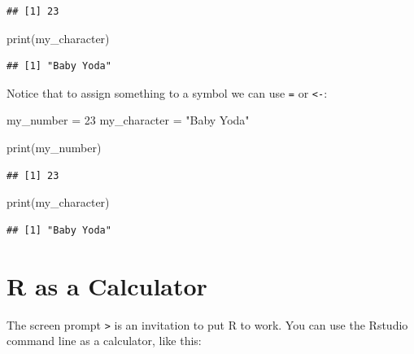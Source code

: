 \documentclass[
]{book}
\newenvironment{Shaded}{\begin{snugshade}}{\end{snugshade}}
\newcommand{\DecValTok}[1]{\textcolor[rgb]{0.00,0.00,0.81}{#1}}
\newcommand{\FunctionTok}[1]{\textcolor[rgb]{0.00,0.00,0.00}{#1}}
\newcommand{\NormalTok}[1]{#1}
\newcommand{\OtherTok}[1]{\textcolor[rgb]{0.56,0.35,0.01}{#1}}
\newcommand{\StringTok}[1]{\textcolor[rgb]{0.31,0.60,0.02}{#1}}
\begin{document}
\begin{verbatim}
## [1] 23
\end{verbatim}

\begin{Shaded}
\begin{Highlighting}[]
\FunctionTok{print}\NormalTok{(my\_character)}
\end{Highlighting}
\end{Shaded}

\begin{verbatim}
## [1] "Baby Yoda"
\end{verbatim}

Notice that to assign something to a symbol we can use \texttt{=} or \texttt{\textless{}-}:

\begin{Shaded}
\begin{Highlighting}[]
\NormalTok{my\_number }\OtherTok{=} \DecValTok{23}
\NormalTok{my\_character }\OtherTok{=} \StringTok{"Baby Yoda"}
\end{Highlighting}
\end{Shaded}

\begin{Shaded}
\begin{Highlighting}[]
\FunctionTok{print}\NormalTok{(my\_number)}
\end{Highlighting}
\end{Shaded}

\begin{verbatim}
## [1] 23
\end{verbatim}

\begin{Shaded}
\begin{Highlighting}[]
\FunctionTok{print}\NormalTok{(my\_character)}
\end{Highlighting}
\end{Shaded}

\begin{verbatim}
## [1] "Baby Yoda"
\end{verbatim}

\hypertarget{r-as-a-calculator}{%
\section{R as a Calculator}\label{r-as-a-calculator}}

The screen prompt \texttt{\textgreater{}} is an invitation to put R to work. You can use the Rstudio command line as a calculator, like this:
\end{document}
